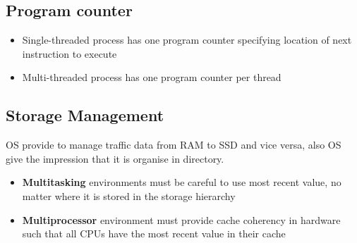 \subsection{Program counter}
\begin{itemize}
    \item Single-threaded process has one program counter specifying location of next instruction to execute
    \item Multi-threaded process has one program counter per thread
\end{itemize}

\subsection{Storage Management}

OS provide to manage traffic data from RAM to SSD and vice versa, also OS give the impression that it is organise in directory.

\begin{itemize}
    \item \textbf{Multitasking} environments must be careful to use most recent
value, no matter where it is stored in the storage hierarchy
    \item \textbf{Multiprocessor} environment must provide cache coherency in
hardware such that all CPUs have the most recent value in their
cache
\end{itemize}


